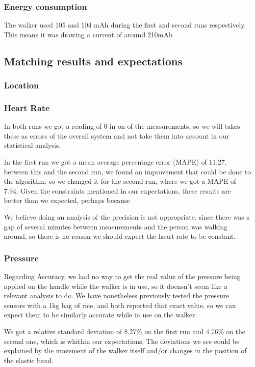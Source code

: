 		\subsubsection{Energy consumption}
			The walker used 105 and 104 mAh during the first and second runs respectively. This means it was drawing a current of around 210mAh
	\subsection{Matching results and expectations}
		\subsubsection{Location}

		\subsubsection{Heart Rate}
			In both runs we got a reading of 0 in on of the measurements, so we will takes these as errors of the overall system and not take them into account in our statistical analysis.

			In the first run we got a mean average percentage error (MAPE) of 11.27, between this and the second run, we found an improvement that could be done to the algorithm, so we changed it for the second run, where we got a MAPE of 7.94. Given the constraints mentioned in our expectations, these results are better than we expected, perhaps because %

			We believe doing an analysis of the precision is not appropriate, since there was a gap of several minutes between measurements and the person was walking around, so there is no reason we should expect the heart rate to be constant.

		\subsubsection{Pressure}
			Regarding Accuracy, we had no way to get the real value of the pressure being applied on the handle while the walker is in use, so it doensn't seem like a relevant analysis to do. We have nonetheless previously tested the pressure sensors with a 1kg bag of rice, and both reported that exact value, so we can expect them to be similarly accurate while in use on the walker.

			We got a relative standard deviation of 8.27\% on the first run and 4.76\% on the second one, which is whithin our expectations. The deviations we see could be explained by the movement of the walker itself and/or changes in the position of the elastic band.

